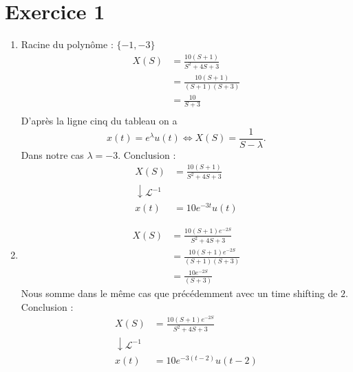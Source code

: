 \documentclass{article}
\theoremstyle{plain}%
\theoremstyle{definition}
\theoremstyle{remark}
\begin{document}
\section{Exercice 1}
\begin{enumerate}
    \item Racine du polynôme : $ \{-1, -3\} $ 
    \begin{align*}
        X(S) &= \frac{10 (S+1)}{S^2 + 4S + 3} \\
            &= \frac{10 (S+1)}{(S+1)(S+3)} \\
            &= \frac{10}{S+3}\\
    \end{align*}
    D'après la ligne cinq du tableau on a 
    \[
        x(t) = e^\lambda u(t) \Leftrightarrow X(S) = \frac{1}{S - \lambda }
    .\]
    Dans notre cas $ \lambda = -3 $. Conclusion : 
    \begin{align*}
        X(S) &= \frac{10 (S+1)}{S^2 + 4S + 3} \\
        \downarrow \mathcal{L}^{-1}& \\
            x(t) &= 10e^{-3t}u(t)
    \end{align*} 
    
    \item \begin{align*}
        X(S) &= \frac{10 (S+1)e^{-2S}}{S^2 + 4S + 3} \\
        &= \frac{10 (S+1)e^{-2S}}{(S+1)(S+3)} \\
        &= \frac{10e^{-2S}}{(S+3)} 
    \end{align*}
    Nous somme dans le même cas que précédemment avec un time shifting de $ 2 $. Conclusion :
    \begin{align*}
        X(S) &= \frac{10 (S+1)e^{-2S}}{S^2 + 4S + 3}\\
        \downarrow \mathcal{L}^{-1}& \\
            x(t) &= 10e^{-3(t-2)}u(t-2)
    \end{align*}
    

\end{enumerate}
\end{document}
